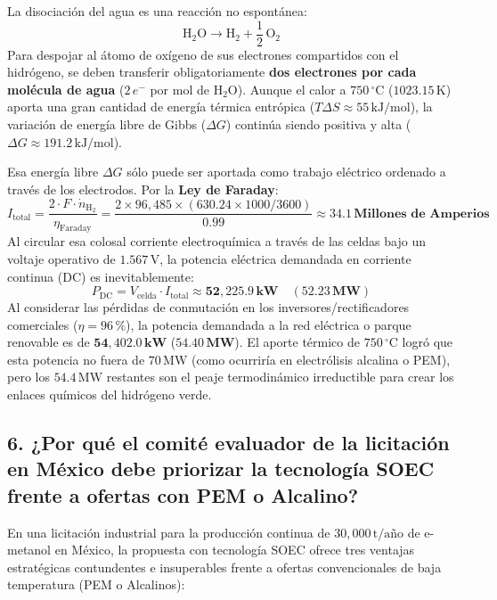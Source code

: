 \documentclass[11pt,a4paper]{article}
\begin{document}
La disociación del agua es una reacción no espontánea:
\begin{equation}
    \text{H}_2\text{O} \longrightarrow \text{H}_2 + \frac{1}{2}\,\text{O}_2
\end{equation}
Para despojar al átomo de oxígeno de sus electrones compartidos con el hidrógeno, se deben transferir obligatoriamente \textbf{dos electrones por cada molécula de agua} ($2\,e^-$ por mol de $\text{H}_2\text{O}$). Aunque el calor a $750\,^\circ\text{C}$ ($1023.15\,\text{K}$) aporta una gran cantidad de energía térmica entrópica ($T\Delta S \approx 55\,\text{kJ/mol}$), la variación de energía libre de Gibbs ($\Delta G$) continúa siendo positiva y alta ($\Delta G \approx 191.2\,\text{kJ/mol}$).

Esa energía libre $\Delta G$ sólo puede ser aportada como trabajo eléctrico ordenado a través de los electrodos. Por la \textbf{Ley de Faraday}:
\begin{equation}
    I_{\text{total}} = \frac{2 \cdot F \cdot \dot{n}_{\text{H}_2}}{\eta_{\text{Faraday}}} = \frac{2 \times 96{,}485 \times (630.24 \times 1000 / 3600)}{0.99} \approx \mathbf{34.1\,\text{Millones de Amperios}}
\end{equation}
Al circular esa colosal corriente electroquímica a través de las celdas bajo un voltaje operativo de $1.567\,\text{V}$, la potencia eléctrica demandada en corriente continua (DC) es inevitablemente:
\begin{equation}
    P_{\text{DC}} = V_{\text{celda}} \cdot I_{\text{total}} \approx \mathbf{52{,}225.9\,\text{kW}} \quad (\mathbf{52.23\,\text{MW}})
\end{equation}
Al considerar las pérdidas de conmutación en los inversores/rectificadores comerciales ($\eta = 96\,\%$), la potencia demandada a la red eléctrica o parque renovable es de $\mathbf{54{,}402.0\,\text{kW}}$ ($\mathbf{54.40\,\text{MW}}$). El aporte térmico de $750\,^\circ\text{C}$ logró que esta potencia no fuera de $70\,\text{MW}$ (como ocurriría en electrólisis alcalina o PEM), pero los $54.4\,\text{MW}$ restantes son el peaje termodinámico irreductible para crear los enlaces químicos del hidrógeno verde.

\subsection{6. ¿Por qué el comité evaluador de la licitación en México debe priorizar la tecnología SOEC frente a ofertas con PEM o Alcalino?}
En una licitación industrial para la producción continua de $30{,}000\,\text{t/año}$ de e-metanol en México, la propuesta con tecnología SOEC ofrece tres ventajas estratégicas contundentes e insuperables frente a ofertas convencionales de baja temperatura (PEM o Alcalinos):
\end{document}
